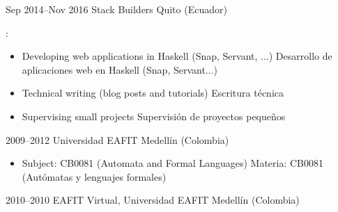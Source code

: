
\cventry
{Sep 2014--Nov 2016}
{}
{Stack Builders}
{Quito (Ecuador)}
{}
{:
  \begin{itemize}
  \item
    \enes
    {Developing web applications in Haskell (Snap, Servant, ...)}
    {Desarrollo de aplicaciones web en Haskell (Snap, Servant...)}
  \item
    \enes
    {Technical writing (blog posts and tutorials)}
    {Escritura técnica}
  \item
    \enes
    {Supervising small projects}
    {Supervisión de proyectos pequeños}
  \end{itemize}
}

\cventry
{2009--2012}
{}
{Universidad EAFIT}
{Medellín (Colombia)}
{}
{\begin{itemize}
  \item
    \enes
    {Subject: CB0081 (Automata and Formal Languages)}
    {Materia: CB0081 (Autómatas y lenguajes formales)}
  \end{itemize}
}

\cventry
{2010--2010}
{}
{EAFIT Virtual, Universidad EAFIT}
{Medellín (Colombia)}
{}
{}

